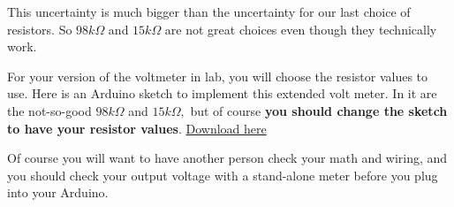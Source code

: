 This uncertainty is much bigger than the uncertainty for our last choice of
resistors. So $98\unit{k%
\Omega%
}$ and $15\unit{k%
\Omega%
}$ are not great choices even though they technically work.

For your version of the voltmeter in lab, you will choose the resistor
values to use. Here is an Arduino sketch to implement this extended volt
meter. In it are the not-so-good $98\unit{k%
\Omega%
}$ and $15\unit{k%
\Omega%
},$ but of course \textbf{you should change the sketch to have your resistor
values}.
\href{https://dtoliphant.github.io/PH250Manual/Code/DAQ_Extended_voltmeter.ino}{Download here}

% 
% 
% 

\bigskip Of course you will want to have another person check your math and
wiring, and you should check your output voltage with a stand-alone meter
before you plug into your Arduino.

